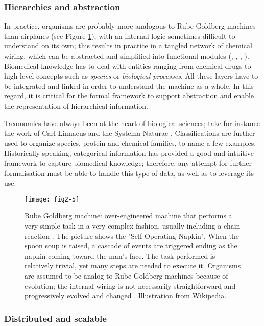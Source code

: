 \subsubsection{Hierarchies and abstraction}
\label{reqhie}

In practice, organisms are probably more analogous to Rube-Goldberg machines than airplanes (see Figure \ref{fig2-5}), with an internal logic sometimes difficult to understand on its own; this results in practice in a tangled network of chemical wiring, which can be abstracted and simplified into functional modules (\cite{hartwell1999molecular}, \cite{ravasz2002hierarchical}, \cite{machado2011modeling}, \cite{fisher2007executable}). Biomedical knowledge has to deal with entities ranging from chemical drugs to high level concepts such as \emph{species} or \emph{biological processes}. All these layers have to be integrated and linked in order to understand the machine as a whole. In this regard, it is critical for the formal framework to support abstraction and enable the representation of hierarchical information.

Taxonomies have always been at the heart of biological sciences; take for instance the work of Carl Linnaeus and the Systema Naturae \citep{von1770systema}. Classifications are further used to organize species, protein and chemical families, to name a few examples. Historically speaking, categorical information has provided a good and intuitive framework to capture biomedical knowledge; therefore, any attempt for further formalisation must be able to handle this type of data, as well as to leverage its use.

\begin{figure}[ht]
    \centering
    \texttt{[image: fig2-5]}
    \caption{Rube Goldberg machine: over-engineered machine that performs a very simple task in a very complex fashion, usually including a chain reaction \citep{rubewiki}. The picture shows the "Self-Operating Napkin". When the spoon soup is raised, a cascade of events are triggered ending as the napkin coming toward the man's face. The task performed is relatively trivial, yet many steps are needed to execute it. Organisms are assumed to be analog to Rube Goldberg machines because of evolution; the internal wiring is not necessarily straightforward and progressively evolved and changed \citep{ravasz2002hierarchical}. Illustration from Wikipedia.}
    \label{fig2-5}
\end{figure}

\subsubsection{Distributed and scalable}
\label{reqscale}

